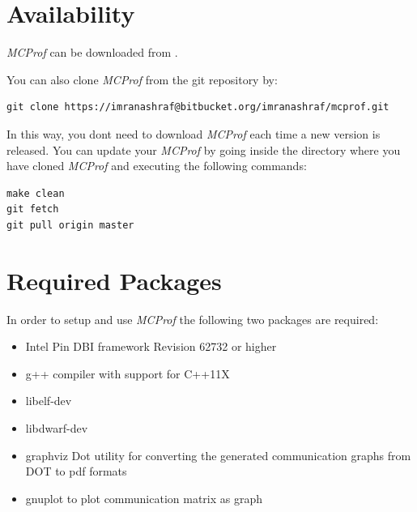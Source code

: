 \documentclass[10pt]{article}
\newcommand{\MCPROF}{\emph{MCProf}}
\begin{document}
\section{Availability}
\label{sec:availability}

\MCPROF{} can be downloaded from \cite{mcprofDownload}.

You can also clone \MCPROF{} from the git repository by:

{
\small
\begin{Verbatim}[frame=single, samepage=true]
git clone https://imranashraf@bitbucket.org/imranashraf/mcprof.git
\end{Verbatim}
}

In this way, you dont need to download \MCPROF{} each time a new version is released.
You can update your \MCPROF{} by going inside the directory where you have cloned \MCPROF{}
and executing the following commands:

{
\small
\begin{Verbatim}[frame=single, samepage=true]
make clean
git fetch
git pull origin master
\end{Verbatim}
}


\section{Required Packages}
\label{sec:reqPackages}

In order to setup and use \MCPROF{} the following two packages are required:

\begin{itemize}

\item Intel Pin DBI framework \cite{Pin_Download} Revision 62732 or higher

\item g++ compiler with support for C++11X

\item libelf-dev

\item libdwarf-dev

\item graphviz Dot utility for converting the generated communication graphs
    from DOT to pdf formats

\item gnuplot to plot communication matrix as graph

\end{itemize}
\end{document}
